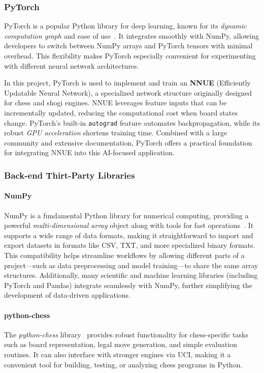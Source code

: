 \documentclass[12pt,a4paper]{article}
\begin{document}
\subsubsection*{PyTorch}
PyTorch is a popular Python library for deep learning, known for its \emph{dynamic computation
graph} and ease of use~\cite{pytorchDocs}. It integrates smoothly with NumPy, allowing developers
to switch between NumPy arrays and PyTorch tensors with minimal overhead. This flexibility makes
PyTorch especially convenient for experimenting with different neural network architectures.

In this project, PyTorch is used to implement and train an \textbf{NNUE} (Efficiently Updatable
Neural Network), a specialized network structure originally designed for chess and shogi engines.
NNUE leverages feature inputs that can be incrementally updated, reducing the computational cost
when board states change. PyTorch’s built-in \texttt{autograd} feature automates backpropagation,
while its robust \emph{GPU acceleration} shortens training time. Combined with a large community
and extensive documentation, PyTorch offers a practical foundation for integrating NNUE into
this AI-focused application.

\subsubsection*{Back-end Thirt-Party Libraries}
\paragraph{NumPy}
NumPy is a fundamental Python library for numerical computing, providing a powerful
\emph{multi-dimensional array} object along with tools for fast operations~\cite{Harris2020Array}. It
supports a wide range of data formats, making it straightforward to import and export datasets
in formats like CSV, TXT, and more specialized binary formats. This compatibility helps
streamline workflows by allowing different parts of a project—such as data preprocessing and
model training—to share the same array structures. Additionally, many scientific and machine
learning libraries (including PyTorch and Pandas) integrate seamlessly with NumPy, further
simplifying the development of data-driven applications.
\paragraph{python-chess}
The \emph{python-chess} library~\cite{python-chess} provides robust functionality for chess-specific
tasks such as board representation, legal move generation, and simple evaluation routines. It can
also interface with stronger engines via UCI, making it a convenient tool for building, testing, or
analyzing chess programs in Python.
\end{document}
